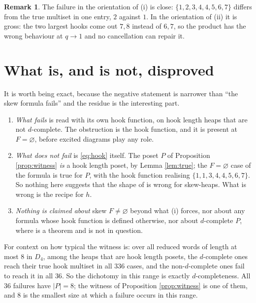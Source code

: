\documentclass[reqno]{amsart}
\theoremstyle{plain}
\theoremstyle{definition}
\newtheorem{remark}[theorem]{Remark}
\begin{document}
\begin{remark}
The failure in the orientation of (i) is close: $\{1,2,3,4,4,5,6,7\}$ differs
from the true multiset in one entry, $2$ against $1$.  In the orientation of
(ii) it is gross: the two largest hooks come out $7,8$ instead of $6,7$, so
the product has the wrong behaviour at $q\to1$ and no cancellation can repair
it.
\end{remark}

\section{What is, and is not, disproved}\label{sec:scope}

It is worth being exact, because the negative statement is narrower than
``the skew formula fails'' and the residue is the interesting part.

\begin{enumerate}
\item \emph{What fails} is \cite[Thm.~1.2]{NO} read with its own hook
function, on hook length heaps that are not $d$-complete.  The obstruction is
the hook function, and it is present at $F=\varnothing$, before excited
diagrams play any role.
\item \emph{What does not fail} is \eqref{eq:hook} itself.  The poset $P$ of
Proposition \ref{prop:witness} \emph{is} a hook length poset, by Lemma
\ref{lem:true}; the $F=\varnothing$ case of the formula is true for $P$, with
the hook function realising $\{1,1,3,4,4,5,6,7\}$.  So nothing here suggests
that the shape of \cite[Thm.~1.2]{NO} is wrong for skew-heaps.  What is wrong
is the recipe for $h$.
\item \emph{Nothing is claimed about} skew $F\ne\varnothing$ beyond what (i)
forces, nor about any formula whose hook function is defined otherwise, nor
about $d$-complete $P$, where \cite[Thm.~1.2]{NO} is a theorem and is not in
question.
\end{enumerate}

For context on how typical the witness is: over all reduced words of length at
most $8$ in $D_4$, among the heaps that are hook length posets, the
$d$-complete ones reach their true hook multiset in all $336$ cases, and the
non-$d$-complete ones fail to reach it in all $36$.  So the dichotomy in this
range is exactly $d$-completeness.  All $36$ failures have $|P|=8$; the
witness of Proposition \ref{prop:witness} is one of them, and $8$ is the
smallest size at which a failure occurs in this range.
\end{document}

